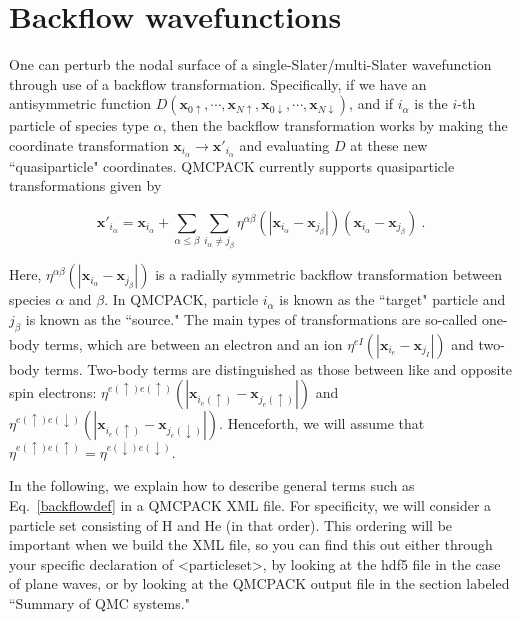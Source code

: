 \section{Backflow wavefunctions}

\label{sec:backflow}

One can perturb the nodal surface of a single-Slater/multi-Slater wavefunction through use of a backflow transformation.  Specifically, if we have an antisymmetric function $D(\mathbf{x}_{0\uparrow},\cdots,\mathbf{x}_{N\uparrow}, \mathbf{x}_{0\downarrow},\cdots,\mathbf{x}_{N\downarrow})$, and if $i_\alpha$ is the $i$-th particle of species type $\alpha$, then the backflow transformation works by making the coordinate transformation $\mathbf{x}_{i_\alpha} \to \mathbf{x}'_{i_\alpha}$ and evaluating $D$ at these new ``quasiparticle" coordinates.  QMCPACK currently supports quasiparticle transformations given by

\begin{equation}\label{backflowdef}
\mathbf{x}'_{i_\alpha}=\mathbf{x}_{i_\alpha}+\sum_{\alpha \leq \beta} \sum_{i_\alpha \neq j_\beta} \eta^{\alpha\beta}(|\mathbf{x}_{i_\alpha}-\mathbf{x}_{j_\beta}|)(\mathbf{x}_{i_\alpha}-\mathbf{x}_{j_\beta})\:.
\end{equation}

Here, $\eta^{\alpha\beta}(|\mathbf{x}_{i_\alpha}-\mathbf{x}_{j_\beta}|)$ is a radially symmetric backflow transformation between species $\alpha$ and $\beta$.  In QMCPACK, particle $i_\alpha$ is known as the ``target" particle and $j_\beta$ is known as the ``source."  The main types of transformations are so-called one-body terms, which are between an electron and an ion $\eta^{eI}(|\mathbf{x}_{i_e}-\mathbf{x}_{j_I}|)$ and two-body terms.  Two-body terms are distinguished as those between like and opposite spin electrons:  $\eta^{e(\uparrow)e(\uparrow)}(|\mathbf{x}_{i_e(\uparrow)}-\mathbf{x}_{j_e(\uparrow)}|)$ and  $\eta^{e(\uparrow)e(\downarrow)}(|\mathbf{x}_{i_e(\uparrow)}-\mathbf{x}_{j_e(\downarrow)}|)$.  Henceforth, we will assume that $\eta^{e(\uparrow)e(\uparrow)}=\eta^{e(\downarrow)e(\downarrow)}$.

In the following, we explain how to describe general terms such as Eq.~\ref{backflowdef} in a QMCPACK XML file.  For specificity, we will consider a particle set consisting of H and He (in that order).  This ordering will be important when we build the XML file, so you can find this out either through your specific declaration of <particleset>, by looking at the hdf5 file in the case of plane waves, or by looking at the QMCPACK output file in the section labeled ``Summary of QMC systems."  
